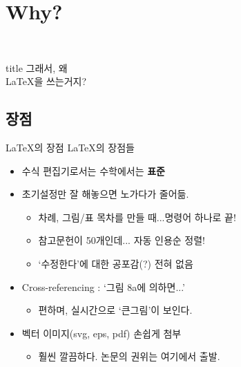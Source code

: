 \documentclass[12pt]{beamer}
\begin{document}
\section{Why?}
\begin{frame}{~}
	\vfill
	\centering
	\begin{beamercolorbox}[sep=8pt,center,shadow=true,rounded=true]{title}
		\Huge 그래서, 왜 \\ \LaTeX 을 쓰는거지?
	\end{beamercolorbox}
	\vfill
\end{frame}
\subsection{장점}
\begin{frame}{\LaTeX 의 장점}
	\LaTeX 의 장점들
	\begin{itemize}
		\item 수식 편집기로서는 수학에서는 \textbf{표준}
		\item 초기설정만 잘 해놓으면 노가다가 줄어듦.
		\begin{itemize}
			\item 차례, 그림/표 목차를 만들 때...명령어 하나로 끝!
			\item 참고문헌이 50개인데... 자동 인용순 정렬!
			\item `수정한다'에 대한 공포감(?) 전혀 없음
		\end{itemize}
		\item Cross-referencing : `그림 8a에 의하면...'
		\begin{itemize}
			\item 편하며, 실시간으로 `큰그림'이 보인다. 
		\end{itemize}
		\item 벡터 이미지(svg, eps, pdf) 손쉽게 첨부
		\begin{itemize}
			\item 훨씬 깔끔하다. 논문의 권위는 여기에서 출발.
		\end{itemize}
	\end{itemize}
\end{frame}
\end{document}
